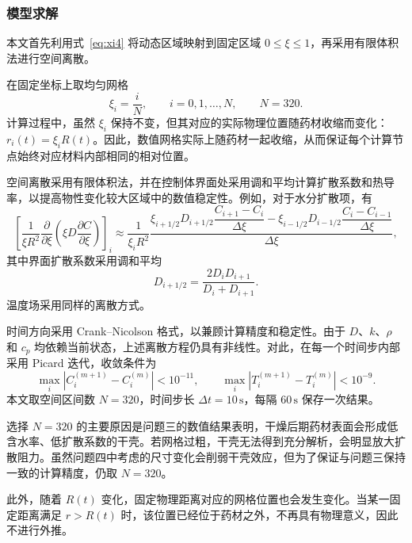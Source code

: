 \documentclass[12pt,a4paper]{article}
\begin{document}
\subsubsection{模型求解}

本文首先利用式~\eqref{eq:xi4} 将动态区域映射到固定区域 \(0\le\xi\le1\)，再采用有限体积法进行空间离散。

在固定坐标上取均匀网格
\begin{equation}
\xi_i=\frac{i}{N},
\qquad
i=0,1,\ldots,N,
\qquad
N=320.
\end{equation}
计算过程中，虽然 \(\xi_i\) 保持不变，但其对应的实际物理位置随药材收缩而变化：\(r_i(t)=\xi_iR(t)\)。因此，数值网格实际上随药材一起收缩，从而保证每个计算节点始终对应材料内部相同的相对位置。

空间离散采用有限体积法，并在控制体界面处采用调和平均计算扩散系数和热导率，以提高物性变化较大区域中的数值稳定性。例如，对于水分扩散项，有
\begin{equation}
\left[
\frac{1}{\xi R^2}
\frac{\partial}{\partial\xi}
\left(
\xi D
\frac{\partial C}{\partial\xi}
\right)
\right]_i
\approx
\frac{1}{\xi_iR^2}
\frac{
\xi_{i+1/2}D_{i+1/2}
\dfrac{C_{i+1}-C_i}{\Delta\xi}
-
\xi_{i-1/2}D_{i-1/2}
\dfrac{C_i-C_{i-1}}{\Delta\xi}
}
{\Delta\xi},
\label{eq:FVM_C4}
\end{equation}
其中界面扩散系数采用调和平均\cite{dasilva2014}
\begin{equation}
D_{i+1/2}
=
\frac{2D_iD_{i+1}}{D_i+D_{i+1}}.
\label{eq:harmonicD4}
\end{equation}
温度场采用同样的离散方式。

时间方向采用 Crank--Nicolson 格式，以兼顾计算精度和稳定性。由于 \(D\)、\(k\)、\(\rho\) 和 \(c_p\) 均依赖当前状态，上述离散方程仍具有非线性。对此，在每一个时间步内部采用 Picard 迭代，收敛条件为
\begin{equation}
\max_i
\left|
C_i^{(m+1)}-C_i^{(m)}
\right|
<10^{-11},
\qquad
\max_i
\left|
T_i^{(m+1)}-T_i^{(m)}
\right|
<10^{-9}.
\end{equation}
本文取空间区间数 \(N=320\)，时间步长 \(\Delta t=10\,\mathrm{s}\)，每隔 \(60\,\mathrm{s}\) 保存一次结果。

选择 \(N=320\) 的主要原因是问题三的数值结果表明，干燥后期药材表面会形成低含水率、低扩散系数的干壳。若网格过粗，干壳无法得到充分解析，会明显放大扩散阻力。虽然问题四中考虑的尺寸变化会削弱干壳效应，但为了保证与问题三保持一致的计算精度，仍取 \(N=320\)。

此外，随着 \(R(t)\) 变化，固定物理距离对应的网格位置也会发生变化。当某一固定距离满足 \(r>R(t)\) 时，该位置已经位于药材之外，不再具有物理意义，因此不进行外推。
\end{document}
